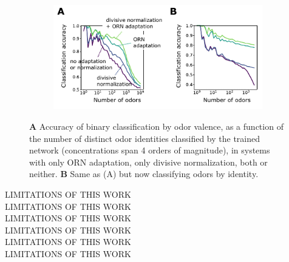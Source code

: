 \documentclass[9pt,twocolumn,twoside,lineno]{pnas-new}
\begin{document}
\begin{figure}[tbh]
	\centering
	\begin{subfigure}[t]{\linewidth}
		\includegraphics[width=\textwidth]{figures/5_downstream}
		\label{fig:downstream_a}	
	\end{subfigure}
	\begin{subfigure}[t]{0\linewidth}
		\label{fig:downstream_b}
	\end{subfigure}
	\begin{subfigure}[t]{0\linewidth}
		\label{fig:downstream_c}
	\end{subfigure}
	\begin{subfigure}[t]{0\linewidth}
		\label{fig:downstream_d}
	\end{subfigure}
	\caption{\footnotesize{
	\textbf{A} Accuracy of binary classification by odor valence, as a function of the number of distinct odor identities classified by the trained network (concentrations span 4 orders of magnitude), in systems with only ORN adaptation, only divisive normalization, both or neither. \textbf{B} Same as (A) but now classifying odors  by identity.
	}}
	\label{fig:downstream}
\end{figure}

LIMITATIONS OF THIS WORK \\
LIMITATIONS OF THIS WORK \\
LIMITATIONS OF THIS WORK \\
LIMITATIONS OF THIS WORK \\
LIMITATIONS OF THIS WORK \\
LIMITATIONS OF THIS WORK \\


\end{document}
